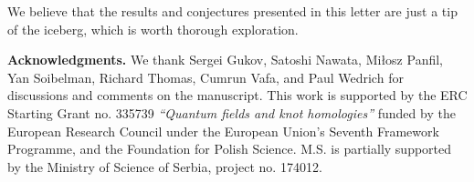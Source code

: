\documentclass[
 reprint,
 amsmath,amssymb,
 aps,prl
]{revtex4-1}
\begin{document}
We believe that the results and conjectures presented in this letter are just a tip of the iceberg, which is worth thorough exploration. 




\medskip

{\bf Acknowledgments.}
We thank Sergei Gukov, Satoshi Nawata, Mi{\l}osz Panfil, Yan Soibelman, Richard Thomas, Cumrun Vafa, and Paul Wedrich for discussions and comments on the manuscript. This work is supported by the ERC Starting Grant no. 335739 \emph{``Quantum fields and knot homologies''} funded by the European Research Council under the European Union’s Seventh Framework Programme, and the Foundation for Polish Science. M.S. is partially supported by the Ministry of Science of Serbia, project no. 174012.









 
\end{document}
